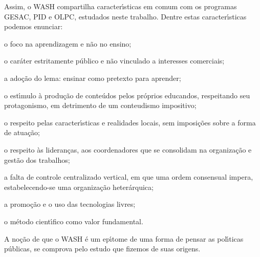 \documentclass[
12pt,		%
openright,	%
twoside,  %
a4paper,			%
chapter=TITLE,		%
english,			%
french,				%
spanish,			%
brazil				%
]{USPSC-classe/USPSC}
\begin{document}
\noindent\begin{center}\mbox{\centering{}}\end{center}


Assim,  o WASH compartilha caracter\'{\i}sticas em comum com os programas GESAC, PID e OLPC, estudados neste trabalho. Dentre estas caracter\'{\i}sticas podemos enunciar:









\begin{alineas}
\item o foco na aprendizagem e n\~ao no ensino;
\item o car\'ater estritamente p\'ublico e n\~ao vinculado a interesses comerciais;
\item a ado\c{c}\~ao do lema: \textquotedbl ensinar como pretexto para aprender\textquotedbl ;
\item o est\'{\i}mulo \`a produ\c{c}\~ao de conte\'udos pelos pr\'oprios educandos, respeitando seu protagonismo, em detrimento de um \textquotedbl conteudismo impositivo\textquotedbl ;
\item o respeito pelas caracter\'{\i}sticas e realidades locais, sem imposi\c{c}\~oes sobre a forma de atua\c{c}\~ao;
\item o respeito \`as lideran\c{c}as, aos coordenadores que se consolidam na organiza\c{c}\~ao e gest\~ao dos trabalhos;
\item a falta de controle centralizado vertical, em que uma ordem consensual impera, estabelecendo-se uma organiza\c{c}\~ao heter\'arquica;
\item a promo\c{c}\~ao e o uso das tecnologias livres;
\item o m\'etodo cient\'{\i}fico como valor fundamental.
\end{alineas}

A no\c{c}\~ao de que o WASH \'e um ep\'{\i}tome de uma forma de pensar as pol\'{\i}ticas p\'ublicas, se comprova pelo estudo que fizemos de suas origens.
\end{document}
